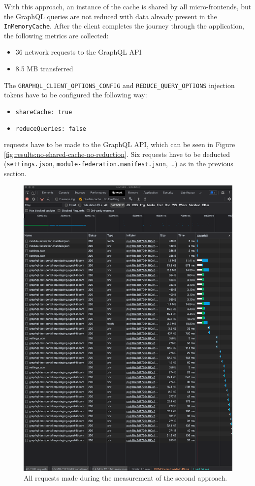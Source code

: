 With this approach, an instance of the cache is shared by all micro-frontends, but the GraphQL queries are not reduced with data already present in the \texttt{InMemoryCache}. After the client completes the journey through the application, the following metrics are collected:

\begin{itemize}
  \item 36 network requests to the GraphQL \ac{API}
  \item 8.5 MB transferred
\end{itemize}

\noindent The \texttt{GRAPHQL\_CLIENT\_OPTIONS\_CONFIG} and \texttt{REDUCE\_QUERY\_OPTIONS} injection tokens have to be configured the following way:

\begin{itemize}
  \item \texttt{shareCache: true}
  \item \texttt{reduceQueries: false}
\end{itemize}

 requests have to be made to the GraphQL \ac{API}, which can be seen in Figure \ref{fig:results:no-shared-cache-no-reduction}. Six requests have to be deducted (\texttt{settings.json}, \texttt{module-federation.manifest.json}, \dots) as in the previous section.

\ifshowImages
\begin{figure}[H]
\centering
\includegraphics[width=0.6\linewidth]{images/results/1-attempt/shared-not-reduced-cache.png}
\caption{All requests made during the measurement of the second approach.}\label{fig:results:shared-cache-no-reduction}
\end{figure}
\fi

